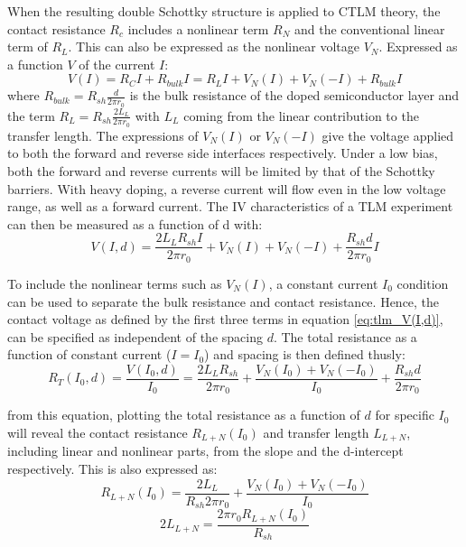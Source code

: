 \begin{refsection}
When the resulting double Schottky structure is applied to CTLM theory, the contact resistance $R_{c}$ includes a nonlinear term $R_{N}$ and the conventional linear term of $R_{L}$. This can also be expressed as the nonlinear voltage $V_{N}$. Expressed as a function $V$ of the current $I$:
\begin{equation}
    V(I) = R_{C}I + R_{bulk}I = R_{L}I + V_{N}(I) + V_{N}(-I) + R_{bulk}I
\end{equation}
where $R_{bulk} = R_{sh}\frac{d}{2\pi r_{0}}$ is the bulk resistance of the doped semiconductor layer and the term $R_{L} = R_{sh}\frac{2L_{L}}{2\pi r_{0}}$ with $L_{L}$ coming from the linear contribution to the transfer length. The expressions of $V_{N}(I)$ or $V_{N}(-I)$ give the voltage applied to both the forward and reverse side interfaces respectively. Under a low bias, both the forward and reverse currents will be limited by that of the Schottky barriers. With heavy doping, a reverse current will flow even in the low voltage range, as well as a forward current. The IV characteristics of a TLM experiment can then be measured as a function of d with:
\begin{equation}
    V(I,d) = \frac{2L_{L}R_{sh}I}{2\pi r_{0}} + V_{N}(I) + V_{N}(-I) + \frac{R_{sh}d}{2\pi r_{0}}I
    \label{eq:tlm_V(I,d)}
\end{equation}

To include the nonlinear terms such as $V_{N}(I)$, a constant current $I_{0}$ condition can be used to separate the bulk resistance and contact resistance. Hence, the contact voltage as defined by the first three terms in equation \ref{eq:tlm_V(I,d)}, can be specified as independent of the spacing $d$. The total resistance as a function of constant current ($I=I_{0}$) and spacing is then defined thusly:
\begin{equation}
    R_{T}(I_{0},d) = \frac{V(I_{0},d)}{I_{0}} = \frac{2L_{L}R_{sh}}{2\pi r_{0}} + \frac{V_{N}(I_{0}) + V_{N}(-I_{0})}{I_{0}} + \frac{R_{sh}d}{2\pi r_{0}}
    \label{eq:tlm_R(I,d)}
\end{equation}

from this equation, plotting the total resistance as a function of $d$ for specific $I_{0}$ will reveal the contact resistance $R_{L+N}(I_{0})$ and transfer length $L_{L+N}$, including linear and nonlinear parts, from the slope and the d-intercept respectively. This is also expressed as:
\begin{equation}
    R_{L+N}(I_{0}) = \frac{2L_{L}}{R_{sh}2\pi r_{0}} + \frac{V_{N}(I_{0}) + V_{N}(-I_{0})}{I_{0}}
    \label{eq:tlm_contact_resistance_R_L+N}
\end{equation}
\begin{equation}
    2L_{L+N} = \frac{2\pi r_{0} R_{L+N}(I_{0})}{R_{sh}}
    \label{eq:tlm_transfer_length_L_L+N}
\end{equation}


\end{refsection}
